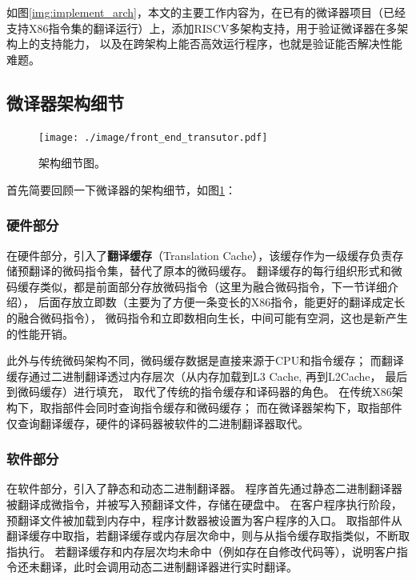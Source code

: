 \documentclass{Style/ucasproposal}%
\begin{document}
如图\ref{img:implement_arch}，本文的主要工作内容为，在已有的微译器项目（已经支持X86指令集的翻译运行）上，添加RISCV多架构支持，用于验证微译器在多架构上的支持能力，
以及在跨架构上能否高效运行程序，也就是验证能否解决性能难题。



\subsection{微译器架构细节}

\begin{figure}[h]
  \centering
  \texttt{[image: ./image/front\_end\_transutor.pdf]}
  \caption{架构细节图。}
  \label{img:front_end_transutor}
\end{figure}

首先简要回顾一下微译器的架构细节，如图\ref{img:front_end_transutor}：

\subsubsection{硬件部分}

在硬件部分，引入了\textbf{翻译缓存}（Translation Cache），该缓存作为一级缓存负责存储预翻译的微码指令集，替代了原本的微码缓存。
翻译缓存的每行组织形式和微码缓存类似，都是前面部分存放微码指令（这里为融合微码指令，下一节详细介绍），
后面存放立即数（主要为了方便一条变长的X86指令，能更好的翻译成定长的融合微码指令），
微码指令和立即数相向生长，中间可能有空洞，这也是新产生的性能开销。

此外与传统微码架构不同，微码缓存数据是直接来源于CPU和指令缓存；
而翻译缓存通过二进制翻译透过内存层次（从内存加载到L3 Cache, 再到L2Cache， 最后到微码缓存）进行填充，
取代了传统的指令缓存和译码器的角色。
在传统X86架构下，取指部件会同时查询指令缓存和微码缓存；
而在微译器架构下，取指部件仅查询翻译缓存，硬件的译码器被软件的二进制翻译器取代。

\subsubsection{软件部分}

在软件部分，引入了静态和动态二进制翻译器。
程序首先通过静态二进制翻译器被翻译成微指令，并被写入预翻译文件，存储在硬盘中。
在客户程序执行阶段，预翻译文件被加载到内存中，程序计数器被设置为客户程序的入口。
取指部件从翻译缓存中取指，若翻译缓存或内存层次命中，则与从指令缓存取指类似，不断取指执行。
若翻译缓存和内存层次均未命中（例如存在自修改代码等），说明客户指令还未翻译，此时会调用动态二进制翻译器进行实时翻译。
\end{document}
